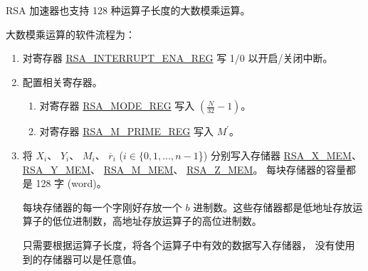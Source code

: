 \documentclass[main\_\_CN.tex]{subfiles}
\begin{document}
RSA 加速器也支持 128 种运算子长度的大数模乘运算。

大数模乘运算的软件流程为：

\begin{enumerate}

    \item 对寄存器 \hyperref[regdesc:RSAINTERRUPTENAREG]{RSA\_INTERRUPT\_ENA\_REG} 写 1/0 以开启/关闭中断。

    \item 配置相关寄存器。

    \begin{enumerate}
        \item 对寄存器 \hyperref[regdesc:RSAMODEXPMODEREG]{RSA\_MODE\_REG} 写入 \begin{math}( \frac{N}{32} - 1 )\end{math}。

        \item 对寄存器 \hyperref[regdesc:RSAMPRIMEREG]{RSA\_M\_PRIME\_REG} 写入 \begin{math}M^{\prime}\end{math}。

    \end{enumerate}

    \item 将
        \begin{math}X_{i}\end{math}、
        \begin{math}Y_{i}\end{math}、
        \begin{math}M_{i}\end{math}、
        \begin{math}\overline{r}_{i}\end{math}
        (\begin{math}i \in \{0, 1, \dots, n-1\end{math}\})
        分别写入存储器
        \hyperref[regdesc:RSAmemory]{RSA\_X\_MEM}、
        \hyperref[regdesc:RSAmemory]{RSA\_Y\_MEM}、
        \hyperref[regdesc:RSAmemory]{RSA\_M\_MEM}、
        \hyperref[regdesc:RSAmemory]{RSA\_Z\_MEM}。
        每块存储器的容量都是 128 字 (word)。

        每块存储器的每一个字刚好存放一个 \begin{math}b\end{math} 进制数。这些存储器都是低地址存放运算子的低位进制数，高地址存放运算子的高位进制数。

        只需要根据运算子长度，将各个运算子中有效的数据写入存储器，
        没有使用到的存储器可以是任意值。


\end{enumerate}
\end{document}
